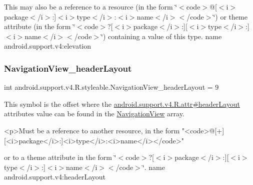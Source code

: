 This may also be a reference to a resource (in the form \char`\"{}$<$code$>$@\mbox{[}$<$i$>$package$<$/i$>$\+:\mbox{]}$<$i$>$type$<$/i$>$\+:$<$i$>$name$<$/i$>$$<$/code$>$\char`\"{}) or theme attribute (in the form \char`\"{}$<$code$>$?\mbox{[}$<$i$>$package$<$/i$>$\+:\mbox{]}\mbox{[}$<$i$>$type$<$/i$>$\+:\mbox{]}$<$i$>$name$<$/i$>$$<$/code$>$\char`\"{}) containing a value of this type.  name android.\+support.\+v4\+:elevation \mbox{\label{classandroid_1_1support_1_1v4_1_1R_1_1styleable_a8beaea7d5f50233cb1a16143dfc217c8}} 
\subsubsection{\texorpdfstring{Navigation\+View\+\_\+header\+Layout}{NavigationView\_headerLayout}}
{\footnotesize\ttfamily int android.\+support.\+v4.\+R.\+styleable.\+Navigation\+View\+\_\+header\+Layout = 9\hspace{0.3cm}{\ttfamily [static]}}

This symbol is the offset where the \hyperlink{classandroid_1_1support_1_1v4_1_1R_1_1attr_a3832cf62beb2ee9abc9cf44e6d387519}{android.\+support.\+v4.\+R.\+attr\#header\+Layout} attribute\textquotesingle{}s value can be found in the \hyperlink{classandroid_1_1support_1_1v4_1_1R_1_1styleable_a6e99b86cbaa0c61ca7598c15df537789}{Navigation\+View} array.

\begin{DoxyVerb}      <p>Must be a reference to another resource, in the form "<code>@[+][<i>package</i>:]<i>type</i>:<i>name</i></code>"
\end{DoxyVerb}
 or to a theme attribute in the form \char`\"{}$<$code$>$?\mbox{[}$<$i$>$package$<$/i$>$\+:\mbox{]}\mbox{[}$<$i$>$type$<$/i$>$\+:\mbox{]}$<$i$>$name$<$/i$>$$<$/code$>$\char`\"{}.  name android.\+support.\+v4\+:header\+Layout \mbox{\label{classandroid_1_1support_1_1v4_1_1R_1_1styleable_afc0d87aca6dd3fb4c0540b58a90cca8e}} 
